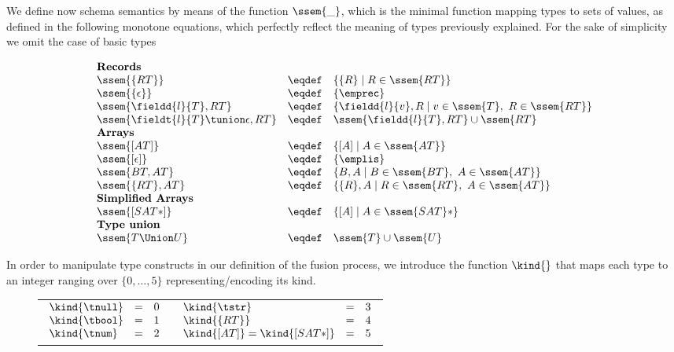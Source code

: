 We define now schema semantics by means of the function  $\ssem{\_}$, which  is the minimal function mapping types to sets of values, as defined in the following monotone equations, which perfectly reflect the meaning of types previously explained. For the sake of simplicity we omit the case of basic types 



\[
\begin{array}{lcll}

\text{\bf Records}\\
\ssem{\{RT\}} &\eqdef & 	\{ \{ R \} \mid R \in \ssem{RT} \} \\
\ssem{\{\epsilon\}} &\eqdef & 	 \{\emprec\} \\

\ssem{\fieldd{l}{T},RT} &\eqdef & \{  \fieldd{l}{v}, R \mid v \in \ssem{T}, \ R \in \ssem{RT} \}\\
\ssem{\fieldt{l}{T}\tunion\epsilon, RT} 	&\eqdef & 		\ssem{\fieldd{l}{T},RT} \cup  \ssem{RT} \\

\text{\bf Arrays}\\
\ssem{[AT]} &\eqdef & 	 \{ [A] \mid A\in \ssem{AT} \} \\
\ssem{[\epsilon]} &\eqdef & 	 \{\emplis\} \\
\ssem{BT , AT}  & \eqdef & 	\{ B , A \mid B\in \ssem{BT} , \  A \in \ssem{AT} \} \\ 
\ssem{\{RT\} , AT}  & \eqdef & 	\{ \{R\} , A \mid  R \in \ssem{RT}, \  A \in \ssem{AT} \} \\ 
\text{\bf Simplified Arrays}\\
\ssem{[SAT*]}  &\eqdef& \{[A] \mid A \in \ssem{SAT}*\}\\

\text{\bf Type union}\\
\ssem{T\Union U} 	&\eqdef & 		\ssem{T}\cup\ssem{U}\\
\end{array}
\]


\medskip

In order to manipulate type constructs in our definition of  the fusion process,  we introduce the function $\kind{}$ that maps each type to an integer ranging over $\{0,\ldots, 5\}$ representing/encoding its kind. 

\begin{figure}[ht]
\centering
\begin{tabular}{cc}
$\begin{array}{*{3}{l}}
\kind{\tnull} & = & 0 \\
\kind{\tbool} &= & 1 \\
\kind{\tnum} &= & 2 \\
\end{array}$
&
$\begin{array}{*{3}{l}}
\kind{\tstr} & = & 3 \\
\kind{\{RT\}} & = & 4 \\
\kind{[AT]} = \kind{[SAT*]} &= & 5\\
\end{array}$
\end{tabular}
\end{figure}

